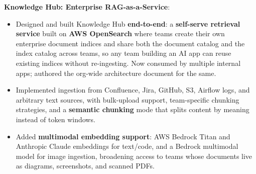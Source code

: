 \documentclass[letterpaper,10pt]{article}
\newcommand{\resumeItem}[2]{
  \item\small{
    \textbf{#1}{:} 
  \begin{itemize}[label=\textbullet, leftmargin=8pt, itemsep=3pt]
      #2
    \end{itemize}
    }
}
\begin{document}
            \resumeItem{Knowledge Hub: Enterprise RAG-as-a-Service}
            {
                \item Designed and built Knowledge Hub \textbf{end-to-end}: a \textbf{self-serve retrieval service} built on \textbf{AWS OpenSearch} where teams create their own enterprise document indices and share both the document catalog and the index catalog across teams, so any team building an AI app can reuse existing indices without re-ingesting. Now consumed by multiple internal apps; authored the org-wide architecture document for the same.

                \item Implemented ingestion from Confluence, Jira, GitHub, S3, Airflow logs, and arbitrary text sources, with bulk-upload support, team-specific chunking strategies, and a \textbf{semantic chunking} mode that splits content by meaning instead of token windows.

                \item Added \textbf{multimodal embedding support}: AWS Bedrock Titan and Anthropic Claude embeddings for text/code, and a Bedrock multimodal model for image ingestion, broadening access to teams whose documents live as diagrams, screenshots, and scanned PDFs.
            }
            \vspace{2pt}
\end{document}
